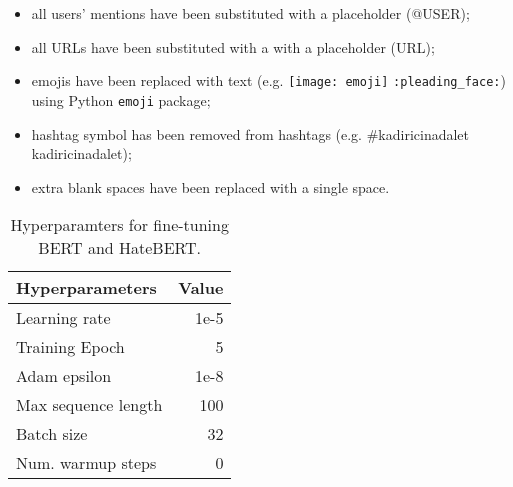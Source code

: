 \documentclass[11pt]{article}
\begin{document}
\begin{itemize}
    \item all users' mentions have been substituted with a placeholder (@USER);
    \item all URLs have been substituted with a with a placeholder (URL);
    \item emojis have been replaced with text (e.g. \texttt{[image: emoji]}  \texttt{:pleading\_face:}) using Python \texttt{emoji} package;
    \item hashtag symbol has been removed from hashtags (e.g. \#kadiricinadalet  kadiricinadalet);
    \item extra blank spaces have been replaced with a single space.
\end{itemize}

\begin{table}[!tbh]
    \centering
    \begin{tabular}{lr}
    \toprule
        \bf Hyperparameters &  \bf Value  
        \\ \midrule
         Learning rate & 1e-5 \\  
         Training Epoch & 5 \\
         Adam epsilon & 1e-8 \\
         Max sequence length & 100 \\
         Batch size & 32 \\
         Num. warmup steps & 0 \\
    \end{tabular}
    \caption{Hyperparamters for fine-tuning BERT and HateBERT.}
    \label{tab:hyper}
\end{table}
\end{document}
